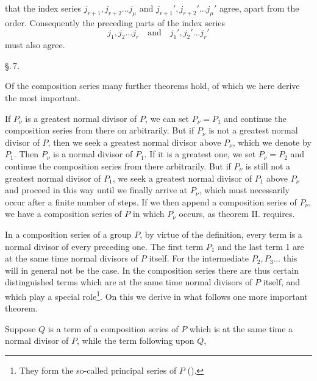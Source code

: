 that the index series $j_{r+1}, j_{r+2} \ldots j_\mu$ and $j_{r+1}',
j_{r+2}' \ldots j_\mu'$ agree, apart from the order.
Consequently the preceding parts of the index series
\[
j_1, j_2 \ldots j_r \quad \text{and} \quad j_1', j_2' \ldots j_r'
\]
must also agree.

\begin{center}
\S.\,7.

\end{center}

Of the composition series many further theorems hold, of
which we here derive the most important.


If $P_\nu$ is a greatest normal divisor of $P$, we can set $P_\nu =
P_1$ and continue the composition series from there on arbitrarily.
But if $P_\nu$ is not a greatest normal divisor of $P$, then we
seek a greatest normal divisor above $P_\nu$, which we denote by
$P_1$. Then $P_\nu$ is a normal divisor of $P_1$. If it is a
greatest one, we set $P_\nu = P_2$ and continue the composition
series from there arbitrarily. But if $P_\nu$ is still not a greatest
normal divisor of $P_1$, we seek a greatest normal divisor of
$P_1$ above $P_\nu$ and proceed in this way until we finally
arrive at $P_\nu$, which must necessarily occur after a finite number
of steps. If we then append a composition series of $P_\nu$, we
have a composition series of $P$ in which $P_\nu$ occurs, as
theorem II. requires.

In a composition series of a group $P$, by virtue of the
definition, every term is a normal divisor of every preceding one.
The first term $P_1$ and the last term 1 are at the same time
normal divisors of $P$ itself. For the intermediate $P_2, P_3
\ldots$ this will in general not be the case. In the composition
series there are thus certain distinguished terms which are at the
same time normal divisors of $P$ itself, and which play a special
role\footnote{They form the so-called principal series of $P$
().}. On this we derive in what follows one more
important theorem.

Suppose $Q$ is a term of a composition series of $P$ which is
at the same time a normal divisor of $P$, while the term following upon $Q$,
